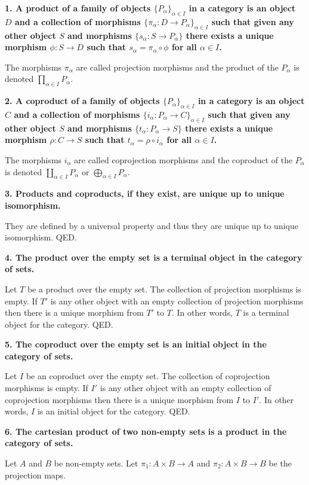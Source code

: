 \documentclass[12pt]{article}
\begin{document}
\textbf{1. A product of a family of objects $\{P_\alpha\}_{\alpha \in I}$ in a category is an object $D$ and a collection of morphisms $\{\pi_\alpha : D \to P_\alpha\}_{\alpha \in I}$ such that given any other object $S$ and morphisms $\{s_\alpha : S \to P_\alpha\}$ there exists a unique morphism $\phi : S \to D$ such that $s_\alpha = \pi_\alpha\circ \phi$ for all $\alpha \in I$.}

The morphisms $\pi_\alpha$ are called projection morphisms and the product of the $P_\alpha$ is denoted $\prod_{\alpha \in I} P_\alpha$.

\textbf{2. A coproduct of a family of objects $\{P_\alpha\}_{\alpha \in I}$ in a category is an object $C$ and a collection of morphisms $\{i_\alpha : P_\alpha \to C\}_{\alpha \in I}$ such that given any other object $S$ and morphisms $\{t_\alpha : P_\alpha \to S\}$ there exists a unique morphism $\rho : C \to S$ such that $t_\alpha = \rho\circ i_\alpha$ for all $\alpha \in I$.}

The morphisms $i_\alpha$ are called coprojection morphisms and the coproduct of the $P_\alpha$ is denoted $\coprod_{\alpha \in I} P_\alpha$ or $\bigoplus_{\alpha \in I} P_\alpha$.

\textbf{3. Products and coproducts, if they exist, are unique up to unique isomorphism.}

They are defined by a universal property and thus they are unique up to unique isomorphism. QED.

\textbf{4. The product over the empty set is a terminal object in the category of sets.}

Let $T$ be a product over the empty set. The collection of projection morphisms is empty. If $T'$ is any other object with an empty collection of projection morphisms then there is a unique morphism from $T'$ to $T$. In other words, $T$ is a terminal object for the category. QED.

\textbf{5. The coproduct over the empty set is an initial object in the category of sets.}

Let $I$ be an coproduct over the empty set. The collection of coprojection morphisms is empty. If $I'$ is any other object with an empty collection of coprojection morphisms then there is a unique morphism from $I$ to $I'$. In other words, $I$ is an initial object for the category. QED.

\textbf{6. The cartesian product of two non-empty sets is a product in the category of sets.}

Let $A$ and $B$ be non-empty sets. Let $\pi_1 : A\times B \to A$ and $\pi_2 : A\times B \to B$ be the projection maps.
\end{document}
